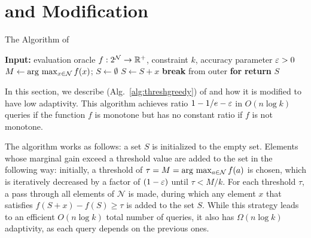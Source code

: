 
\section{\threshgreedy and Modification} \label{apx:threshgreedy}
\begin{algorithm}[t]
   \caption{The \threshgreedy Algorithm of }
   \label{alg:threshgreedy}
   \begin{algorithmic}[1]
     \State \textbf{Input:} evaluation oracle $f:2^{\mathcal N} \to \mathbb{R}^+$, constraint $k$,
     accuracy parameter $\varepsilon > 0$
     \State $M \gets \arg\, \max_{x \in \mathcal N} f(x)$; 
     \State $S \gets \emptyset$
     \State $S \gets S + x$
     \State \textbf{break} from outer \textbf{for}
     \EndIf
     \EndIf
     \EndFor
     \EndFor
     \State \textbf{return} $S$
     \EndProcedure
\end{algorithmic}
\end{algorithm}
In this section, we describe \threshgreedy (Alg.~\ref{alg:threshgreedy}) 
of  and
how it is modified to have low adaptivity. This algorithm achieves 
ratio $1 - 1/e - \varepsilon$ in $O(n \log k)$ queries
if the function $f$ is monotone but has no constant ratio
if $f$ is not monotone. 

The \threshgreedy algorithm works as follows:
a set $S$ is initialized to the empty set. Elements
whose marginal gain exceed a threshold value are added
to the set in the following way:
initially,
a threshold of $\tau = M = \arg\, \max_{a \in \mathcal N} f(a)$
is chosen, which is iteratively decreased by a factor
of $(1 - \varepsilon)$ until $\tau < M/k$. For each threshold $\tau$,
a pass through all elements
of $\mathcal N$ is made, during which any
element $x$ that satisfies $f(S + x) - f(S) \ge \tau$  is added to the set $S$.
While this strategy leads to an efficient $O(n \log k)$ total
number of queries, it also has $\Omega (n \log k)$ adaptivity, as
each query depends on the previous ones.

